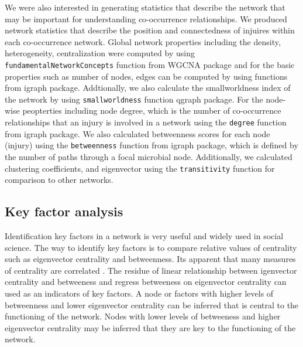 \documentclass[a4paper]{article}
\begin{document}
We were also interested in generating statistics that describe the network that may be important for understanding co-occurrence relationships. We produced network statistics that describe the position and connectedness of injuires within each co-occurrence network. Global network properties including the density, heterogeneity, centralization were computed by using \texttt{fundamentalNetworkConcepts} function from  WGCNA package and for the basic properties such as number of nodes, edges can be computed by using functions from igraph package. Addtionally, we also calculate the smallworldness index of the network by using \texttt{smallworldness} function qgraph package.  For the node-wise peopterties including node degree, which is the number of co-occurrence relationships that an injury is involved in a network using the \texttt{degree} function from igraph package. We also calculated betweenness scores for each node (injury) using the \texttt{betweenness} function from igraph package, which is defined by the number of paths through a focal microbial node. Additionally, we calculated clustering coefficients, and eigenvector using the \texttt{transitivity} function for comparison to other networks.

\subsection*{Key factor analysis}

Identification key factors in a network is very useful and widely used in social science. The way to identify key factors is to compare relative values of centrality such as eigenvector centrality and betweenness. Its apparent that many measures of centrality are correlated \citet{Valente:2008wd}. The residue of linear relationship between igenvector centrality and betweeness and regress betweeness on eigenvector centrality can used as an indicators of key factors. A node or factors with higher levels of betweenness and lower eigenvector centrality can be inferred that is central to the functioning of the network. Nodes with lower levels of betweeness and higher eigenvector centrality may be inferred that they are key to the functioning of the network.


\end{document}
